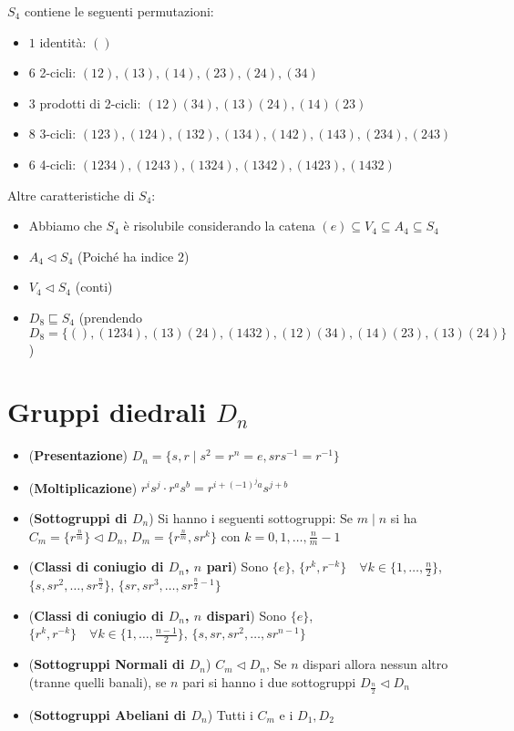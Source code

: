 \documentclass[a4paper,NoNotes,GeneralMath]{stdmdoc}
\newcommand{\sgr}{\sqsubseteq}
\newcommand{\nrm}{\lhd}
\begin{document}
	$S_4$ contiene le seguenti permutazioni:
	\begin{itemize}
		\item $1$ identità: $()$
		\item $6$ 2-cicli: $(12), (13), (14), (23), (24), (34)$
		\item $3$ prodotti di 2-cicli: $(12)(34), (13)(24), (14)(23)$
		\item $8$ 3-cicli: $(123), (124), (132), (134), (142), (143), (234), (243)$
		\item $6$ 4-cicli: $(1234), (1243), (1324), (1342), (1423), (1432)$
	\end{itemize}

	Altre caratteristiche di $S_4$:
	\begin{itemize}
		\item Abbiamo che $S_4$ è risolubile considerando la catena $(e) \subseteq V_4 \subseteq A_4 \subseteq S_4$
		\item $A_4 \nrm S_4$ (Poiché ha indice $2$)
		\item $V_4 \nrm S_4$ (conti)
		\item $D_8 \sgr S_4$ (prendendo $D_8 = \{(), (1234), (13)(24), (1432), (12)(34), (14)(23), (13)(24)\}$)
	\end{itemize}

	\section*{Gruppi diedrali $D_n$}
	\begin{itemize}
		\item ({\bf Presentazione}) $D_n = \lbrace s, r \mid s^2 = r^n = e, srs^{-1} = r^{-1} \rbrace$
		\item ({\bf Moltiplicazione}) $r^{i}s^{j} \cdot r^{a}s^{b} = r^{i + (-1)^{j} a} s^{j + b}$
		\item ({\bf Sottogruppi di $D_n$}) Si hanno i seguenti sottogruppi: Se $m \mid n$ si ha $C_m = \lbrace r^{\frac{n}{m}} \rbrace \nrm D_n$, $D_m = \lbrace r^{\frac{n}{m}}, sr^{k} \rbrace$ con $k = 0, 1, \ldots, \frac{n}{m} - 1$
		\item ({\bf Classi di coniugio di $D_n$, $n$ pari}) Sono $\{e\}$, $\{r^k, r^{-k}\} \quad \forall k \in \{1, \ldots, \frac{n}{2}\}$, $\{s, sr^2, \ldots, sr^{\frac{n}{2}}\}$, $\{sr, sr^3, \ldots, sr^{\frac{n}{2}-1}\}$
		\item ({\bf Classi di coniugio di $D_n$, $n$ dispari}) Sono $\{e\}$, $\{r^k, r^{-k}\} \quad \forall k \in \{1, \ldots, \frac{n-1}{2}\}$, $\{s, sr, sr^2, \ldots, sr^{n-1}\}$
		\item ({\bf Sottogruppi Normali di $D_n$}) $C_m \nrm D_n$, Se $n$ dispari allora nessun altro (tranne quelli banali), se $n$ pari si hanno i due sottogruppi $D_{\frac{n}{2}} \nrm D_n$
		\item ({\bf Sottogruppi Abeliani di $D_n$}) Tutti i $C_m$ e i $D_1, D_2$
	\end{itemize}
\end{document}
